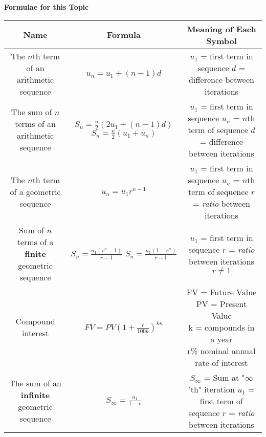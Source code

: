 \documentclass[../main.tex]{subfiles}
\begin{document}
\begin{center}
\textbf{Formulae for this Topic}
\begin{adjustwidth}{-1.5em}{-1em}
\begin{tabular}[c]{||c|c|c||}\hline
    Name & Formula & Meaning of Each Symbol\\\hline
    
    The $n$th term of an arithmetic sequence & $u_n=u_1 + (n-1)d$ &\makecell{$u_1$ = first term in sequence\\ $d$ = difference between iterations}\\\hline
    
    The sum of $n$ terms of an arithmetic sequence & \makecell{$S_n=\frac{n}{2}(2u_1+(n-1)d)$\\$S_n=\frac{n}{2}(u_1+u_n)$} & \makecell{$u_1$ = first term in sequence\\ $u_n$ = $n$th term of sequence\\ $d$ = difference between iterations}\\\hline
    
    The $n$th term of a geometric sequence & $u_n=u_1r^{n-1}$ & \makecell{$u_1$ = first term in sequence\\ $u_n$ = $n$th term of sequence\\ $r$ = \textsl{ratio} between iterations}\\\hline
    
    Sum of $n$ terms of a \textbf{finite} geometric sequence & \makecell{$S_n = \frac{u_1(r^n-1)}{r-1}$\\$S_n = \frac{u_1(1-r^n)}{r-1}$} & \makecell{$u_1$ = first term in sequence\\ $r$ = \textsl{ratio} between iterations\\ $r\ne1$}\\\hline
    
    Compound interest & $FV=PV(1+\frac{r}{100k})^{kn}$ & \makecell{FV = Future Value\\ PV = Present Value\\ k = compounds in a year\\ r\% nominal annual rate of interest}\\\hline
    
    The sum of an \textbf{infinite} geometric sequence & $S_\infty=\frac{u_1}{1-r}$ & \makecell{$S_\infty$ = Sum at "$\infty$'th" iteration\\ $u_1$ = first term of sequence\\ $r$ = \textsl{ratio} between iterations}\\\hline
    

\end{tabular}
\end{adjustwidth}
\end{center}
\end{document}
